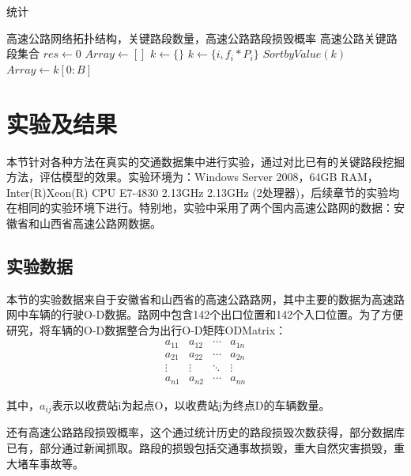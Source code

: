     	\begin{algorithm}[!h]
        \caption{统计}  
        \label{tongji}
        \begin{algorithmic}[1] %
            \Require 高速公路网络拓扑结构，关键路段数量，高速公路路段损毁概率
            \Ensure 高速公路关键路段集合
                \State $res\gets 0$  
                \State $Array\gets []$  
                \State $k\gets \{\}$ 
                	\State $k\gets \{i,f_i*P_i\}$
                \EndFor  
                \State $SortbyValue(k)$
                \State $Array\gets k[0:B]$
                \State {}  
            \EndFunction  
        \end{algorithmic}  
    	\end{algorithm} 


		\section{实验及结果}
		本节针对各种方法在真实的交通数据集中进行实验，通过对比已有的关键路段挖掘方法，评估模型的效果。实验环境为：Windows Server 2008，64GB RAM，Inter(R)Xeon(R) CPU E7-4830 2.13GHz 2.13GHz (2处理器)，后续章节的实验均在相同的实验环境下进行。特别地，实验中采用了两个国内高速公路网的数据：安徽省和山西省高速公路网数据。
			\subsection{实验数据}
				本节的实验数据来自于安徽省和山西省的高速公路路网，其中主要的数据为高速路网中车辆的行驶O-D数据。路网中包含142个出口位置和142个入口位置。为了方便研究，将车辆的O-D数据整合为出行O-D矩阵ODMatrix：
				\[\begin{array}{*{20}{c}}
				{{a_{11}}}&{{a_{12}}}& \cdots &{{a_{1n}}}\\
				{{a_{21}}}&{{a_{22}}}& \cdots &{{a_{2n}}}\\
				 \vdots & \vdots & \ddots & \vdots \\
				{{a_{n1}}}&{{a_{n2}}}& \cdots &{{a_{nn}}}
				\end{array}\]

				其中，$a_{ij}$表示以收费站i为起点O，以收费站j为终点D的车辆数量。

				还有高速公路路段损毁概率，这个通过统计历史的路段损毁次数获得，部分数据库已有，部分通过新闻抓取。路段的损毁包括交通事故损毁，重大自然灾害损毁，重大堵车事故等。


